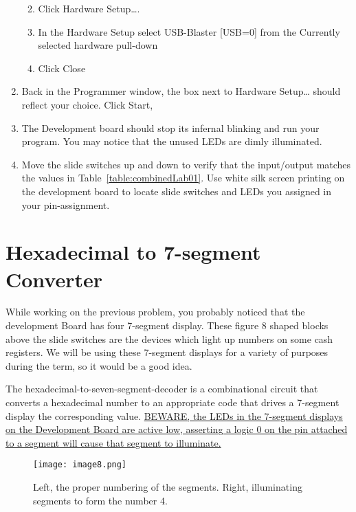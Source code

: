 \begin{enumerate}
        \begin{enumerate}
                \def\labelenumii{\alph{enumii}.}
            \item
                Click Hardware Setup\ldots.
            \item
                In the Hardware Setup select USB-Blaster {[}USB=0{]} from the
                Currently selected hardware pull-down
            \item
                Click Close
        \end{enumerate}
    \item
        Back in the Programmer window, the box next to Hardware Setup\ldots{}
        should reflect your choice. Click Start,
    \item
        The Development board should stop its infernal blinking and run your
        program. You may notice that the unused LEDs are dimly illuminated.
    \item
        Move the slide switches up and down to verify that the input/output
        matches the values in Table~\ref{table:combinedLab01}.  Use white
        silk screen printing on the development board to locate slide switches and
        LEDs you assigned in your pin-assignment.

\end{enumerate}

\section{Hexadecimal to 7-segment Converter}

While working on the previous problem, you probably noticed that the
development Board has four 7-segment display. These figure 8 shaped
blocks above the slide switches are the devices which light up numbers
on some cash registers. We will be using these 7-segment displays for a
variety of purposes during the term, so it would be a good idea.

The hexadecimal-to-seven-segment-decoder is a combinational circuit that
converts a hexadecimal number to an appropriate code that drives a
7-segment display the corresponding value. \uline{BEWARE, the LEDs in
    the 7-segment displays on the Development Board are active low,
    asserting a logic 0 on the pin attached to a segment will cause that
segment to illuminate.}

\begin{figure}[ht]
    \texttt{[image: image8.png]}
    \caption{Left, the proper numbering of the segments. Right,
    illuminating segments to form the number 4.}
    \label{fig:sevenSeg}
\end{figure}

